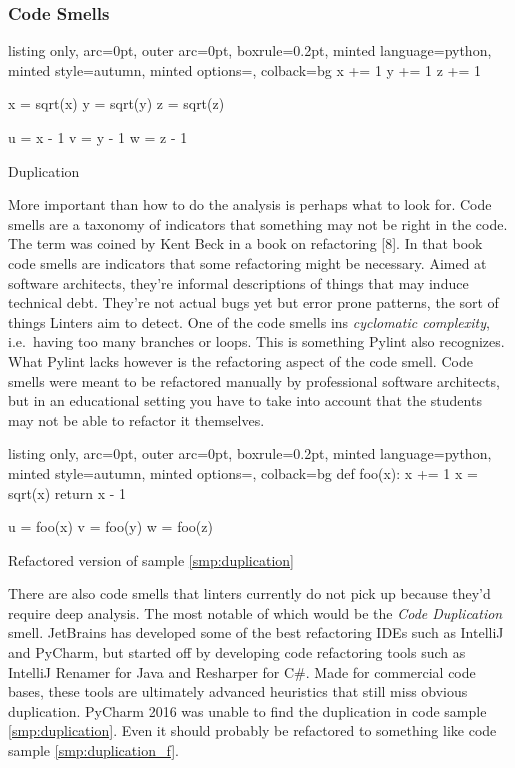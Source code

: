 \documentclass[]{article}
\begin{document}
\subsubsection{Code Smells}\label{code-smells}

\begin{code}
\centering
  \begin{tcblisting}{listing only, 
  arc=0pt,
  outer arc=0pt, 
  boxrule=0.2pt,
  minted language=python,
  minted style=autumn,
  minted options={},
  colback=bg }
x += 1
y += 1
z += 1

x = sqrt(x)
y = sqrt(y)
z = sqrt(z)

u = x - 1
v = y - 1
w = z - 1
\end{tcblisting}
\caption{Duplication}\label{smp:duplication}
\end{code}

More important than how to do the analysis is perhaps what to look for.
Code smells are a taxonomy of indicators that something may not be right
in the code. The term was coined by Kent Beck in a book on refactoring
{[}8{]}. In that book code smells are indicators that some refactoring
might be necessary. Aimed at software architects, they're informal
descriptions of things that may induce technical debt. They're not
actual bugs yet but error prone patterns, the sort of things Linters aim
to detect. One of the code smells ins \emph{cyclomatic complexity},
i.e.~having too many branches or loops. This is something Pylint also
recognizes. What Pylint lacks however is the refactoring aspect of the
code smell. Code smells were meant to be refactored manually by
professional software architects, but in an educational setting you have
to take into account that the students may not be able to refactor it
themselves.

\begin{code}
\centering
  \begin{tcblisting}{listing only, 
  arc=0pt,
  outer arc=0pt, 
  boxrule=0.2pt,
  minted language=python,
  minted style=autumn,
  minted options={},
  colback=bg }
def foo(x):
    x += 1
    x = sqrt(x)
    return x - 1

u = foo(x)
v = foo(y)
w = foo(z)
\end{tcblisting}
\caption{Refactored version of sample \ref{smp:duplication}}\label{smp:duplication_f}
\end{code}

There are also code smells that linters currently do not pick up because
they'd require deep analysis. The most notable of which would be the
\emph{Code Duplication} smell. JetBrains has developed some of the best
refactoring IDEs such as IntelliJ and PyCharm, but started off by
developing code refactoring tools such as IntelliJ Renamer for Java and
Resharper for C\#. Made for commercial code bases, these tools are
ultimately advanced heuristics that still miss obvious duplication.
PyCharm 2016 was unable to find the duplication in code sample
\ref{smp:duplication}. Even it should probably be refactored to
something like code sample \ref{smp:duplication_f}.
\end{document}
